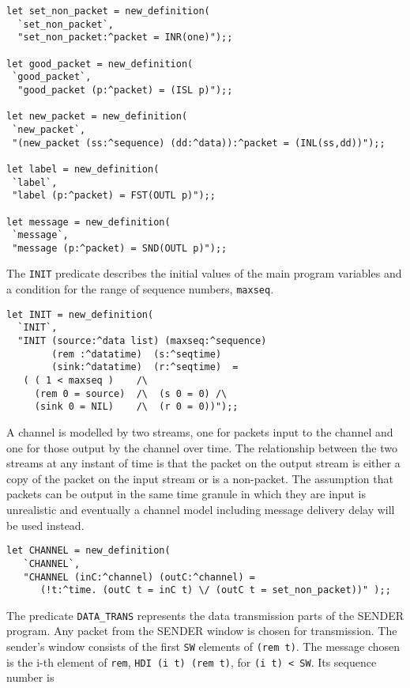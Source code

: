 \begin{session}
\begin{verbatim}
let set_non_packet = new_definition(
  `set_non_packet`,
  "set_non_packet:^packet = INR(one)");;

let good_packet = new_definition(
 `good_packet`,
  "good_packet (p:^packet) = (ISL p)");;

let new_packet = new_definition(
 `new_packet`,
 "(new_packet (ss:^sequence) (dd:^data)):^packet = (INL(ss,dd))");;
   
let label = new_definition(
 `label`,
 "label (p:^packet) = FST(OUTL p)");;

let message = new_definition(
 `message`,
 "message (p:^packet) = SND(OUTL p)");;
\end{verbatim}
\end{session}


The \verb+INIT+ predicate describes the initial values of the main program
variables and a condition for the range of sequence 
numbers, \verb+maxseq+. 

\begin{session}
\begin{verbatim}
let INIT = new_definition(
  `INIT`,
  "INIT (source:^data list) (maxseq:^sequence)
        (rem :^datatime)  (s:^seqtime) 
        (sink:^datatime)  (r:^seqtime)  =
   ( ( 1 < maxseq )    /\ 
     (rem 0 = source)  /\  (s 0 = 0) /\ 
     (sink 0 = NIL)    /\  (r 0 = 0))");;
\end{verbatim}
\end{session}

A channel is modelled by two streams, one for packets input to the channel
and one for those output by the channel over time.
The relationship between the two streams at any instant of time is that
the 
packet on the output stream is either a copy of the packet on the input
stream or is a non-packet.  The assumption that packets can be output
in the same time granule in which they are input is unrealistic
and eventually a channel model including message delivery delay will be 
used instead.

\begin{session}
\begin{verbatim}
let CHANNEL = new_definition(
   `CHANNEL`,
   "CHANNEL (inC:^channel) (outC:^channel) =
      (!t:^time. (outC t = inC t) \/ (outC t = set_non_packet))" );;
\end{verbatim}
\end{session}

The predicate \verb+DATA_TRANS+ represents the data transmission parts of
the SENDER program.  Any packet from the 
SENDER window is chosen for transmission.
The sender's window consists of the first \verb+SW+ elements of 
\verb+(rem t)+.  
The message chosen is the i-th element of \verb+rem+,
\verb+HDI (i t) (rem t)+, for \verb+(i t) < SW+.  Its sequence number
is 

